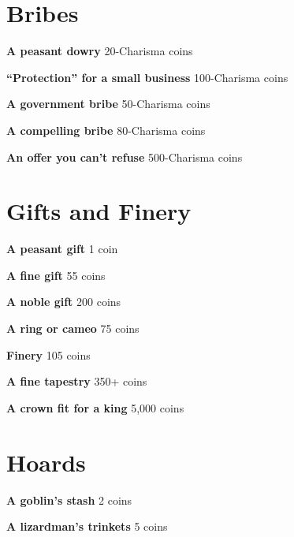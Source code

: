 \section*{Bribes}

{\noindent \bfseries A peasant dowry} \hspace*{\fill} 20-Charisma coins

{\noindent \bfseries ``Protection'' for a small business} \hspace*{\fill} 100-Charisma coins

{\noindent \bfseries A government bribe} \hspace*{\fill} 50-Charisma coins

{\noindent \bfseries A compelling bribe} \hspace*{\fill} 80-Charisma coins

{\noindent \bfseries An offer you can't refuse} \hspace*{\fill} 500-Charisma coins
\section*{Gifts and Finery}

{\noindent \bfseries A peasant gift} \hspace*{\fill} 1 coin

{\noindent \bfseries A fine gift} \hspace*{\fill} 55 coins

{\noindent \bfseries A noble gift} \hspace*{\fill} 200 coins

{\noindent \bfseries A ring or cameo} \hspace*{\fill} 75 coins

{\noindent \bfseries Finery} \hspace*{\fill} 105 coins

{\noindent \bfseries A fine tapestry} \hspace*{\fill} 350+ coins

{\noindent \bfseries A crown fit for a king} \hspace*{\fill} 5,000 coins
\section*{Hoards}

{\noindent \bfseries A goblin's stash} \hspace*{\fill} 2 coins

{\noindent \bfseries A lizardman's trinkets} \hspace*{\fill} 5 coins


